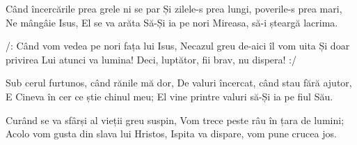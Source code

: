 \beginverse
Când încercările prea grele ni se par
Și zilele-s prea lungi, poverile-s prea mari,
Ne mângâie Isus, El se va arăta
Să-Și ia pe nori Mireasa, să-i șteargă lacrima.
\endverse

\beginchorus
/: Când vom vedea pe nori fața lui Isus,
Necazul greu de-aici îl vom uita
Și doar privirea Lui atunci va lumina!
Deci, luptător, fii brav, nu dispera! :/
\endchorus

\beginverse
Sub cerul furtunos, când rănile mă dor,
De valuri încercat, când stau fără ajutor,
E Cineva în cer ce știe chinul meu;
El vine printre valuri să-Și ia pe fiul Său.
\endverse

\beginverse
Curând se va sfârși al vieții greu suspin,
Vom trece peste râu în țara de lumini;
Acolo vom gusta din slava lui Hristos,
Ispita va dispare, vom pune crucea jos.
\endverse
\endsong